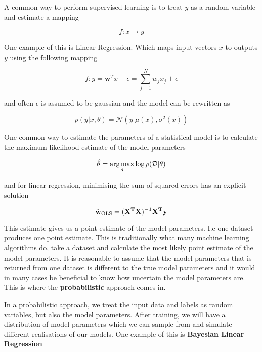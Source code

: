 A common way to perform supervised learning is to treat  $y$ as a random variable and estimate a mapping 

\begin{equation}
    f: x \rightarrow y
\end{equation}

One example of this is Linear Regression. Which maps input vectors $x$ to outputs $y$ using the following mapping \cite[p.~19]{Murphy:2012:Book}

\begin{equation}
    f: y = \mathbf{w}^Tx + \epsilon = \sum_{j=1}^N w_j x_j + \epsilon
\end{equation}

and often $\epsilon$ is assumed to be gaussian and the model can be rewritten as 

\begin{equation}
    p(y|x, \theta) = \mathcal{N}(y|\mu(x), \sigma^2(x))
\end{equation}

One common way to estimate the parameters of a statistical model is to calculate the maximum likelihood estimate of the model parameters \cite[p.~217]{Murphy:2012:Book}

\begin{equation}
    \hat{\mathbf{\theta}} = \operatorname*{arg\,max}_{\theta} \log p(\mathcal{D}|\theta)
\end{equation}

and for linear regression, minimising the sum of squared errors has an explicit solution \cite[p.~220]{Murphy:2012:Book}

\begin{equation}
    \hat{\bf{w}}_{\text{OLS}} = (\bf{X}^T\bf{X})^{-1}\bf{X}^T\bf{y}
\end{equation}

This estimate gives us a point estimate of the model parameters. I.e one dataset produces one point estimate. This is traditionally what many machine learning algorithms do, take a dataset and calculate the most likely point estimate of the model parameters. It is reasonable to assume that the model parameters that is returned from one dataset is different to the true model parameters and it would in many cases be beneficial to know how uncertain the model parameters are. This is where the \textbf{probabilistic} approach comes in.

In a probabilistic approach, we treat the input data and labels as random variables, but also the model parameters. After training, we will have a distribution of model parameters which we can sample from and simulate different realisations of our models. One example of this is \textbf{Bayesian Linear Regression}

